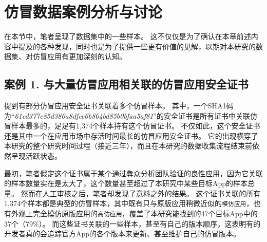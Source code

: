 \section{仿冒数据案例分析与讨论}
\label{chp:casestudy}
在本节中，笔者呈现了数据集中的一些样本。
这不仅仅是为了确认在本章前述内容中提及的各种发现，同时也是为了提供一些更有价值的见解，以期对本研究的数据集、对仿冒应用有更加深刻的认知。

\subsection{案例 1. 与大量仿冒应用相关联的仿冒应用安全证书}
\label{sec:case1}

提到有部分仿冒应用安全证书关联着多个仿冒样本。
其中，一个SHA1码为``\emph{61ed377e85d386a8dfee6b864bd85b0bfaa5af81}''的安全证书是所有证书中关联仿冒样本最多的，足足有1,374个样本持有这个仿冒证书。
不仅如此，这个安全证书还是其中一个在应用市场中存活时间最长的仿冒应用安全证书。
它的出现横穿了本研究的整个研究时间过程（接近三年），而且在本研究的数据收集流程结束前依然呈现活跃状态。

最初，笔者假定这个证书属于某个通过犇众分析团队验证的良性应用，因为它关联的样本数量实在是太大了，这个数量甚至超过了本研究中某些目标App的样本总量。
然而在人工审核之后，笔者却发现了意料之外的结果。
这个证书关联的所有1,374个样本都是典型的仿冒样本，其中既有只与原版应用稍微近似的\texttt{模仿应用}，也有外观上完全模仿原版应用的\texttt{高仿应用}，覆盖了本研究能找到的47个目标App中的37个（79\%）。
而这些证书关联的一些样本，甚至有自己的版本顺序，这表明有的开发者真的会追踪官方App的各个版本来更新、甚至维护自己的仿冒版本。


